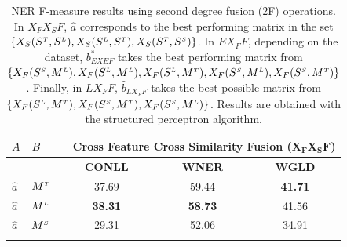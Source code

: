 \begin{table}[t!]
\centering

\caption{NER F-measure results using second degree fusion (2F) operations. In $X_FX_SF$, $\hat{a}$ corresponds to the best performing matrix in the set $\{ X_S(S^{\scriptscriptstyle T}, S^{\scriptscriptstyle L}),X_S(S^{\scriptscriptstyle L}, S^{\scriptscriptstyle T}), \allowbreak X_S(S^{\scriptscriptstyle T}, S^{\scriptscriptstyle S})\}$. In $EX_FF$, depending on the dataset, $b^*_{\scriptscriptstyle EXEF}$  takes the best performing matrix from $\{X_F(S^{\scriptscriptstyle S}, M^{\scriptscriptstyle L}), \allowbreak X_F(S^{\scriptscriptstyle L}, M^{\scriptscriptstyle L}), X_F(S^{\scriptscriptstyle L}, M^{\scriptscriptstyle T}), \allowbreak X_F(S^{\scriptscriptstyle S}, M^{\scriptscriptstyle L}), X_F(S^{\scriptscriptstyle S}, M^{\scriptscriptstyle T}) \}$. Finally, in $LX_FF$, $\hat{b}_{\scriptscriptstyle LX_FF}$ takes the best possible matrix from $\{X_F(S^{\scriptscriptstyle L}, M^{\scriptscriptstyle T}), X_F(S^{\scriptscriptstyle S}, M^{\scriptscriptstyle T}), \allowbreak X_F(S^{\scriptscriptstyle S}, M^{\scriptscriptstyle L}) \}$. Results are obtained with the structured perceptron algorithm.}
\label{tab:ner_2d}
\begin{tabular}{@{}llccc@{}}
	\toprule
	$A$                      & $B$            & \multicolumn{3}{r}{\textbf{Cross Feature Cross Similarity Fusion ($\mathbf{X_FX_SF}$)}}  \\ \midrule
	                         &                & \textbf{CONLL} & \textbf{WNER}  &             \textbf{WGLD}             \\
	\cmidrule{3-5}
$\hat{a}$ & $M^{\scriptscriptstyle T}$      & 37.69 & 59.44 &            \textbf{41.71}             \\
	$\hat{a}$                & $M^{\scriptscriptstyle L}$      & \textbf{38.31} & \textbf{58.73} &            41.56             \\
	$\hat{a}$                & $M^{\scriptscriptstyle S}$      & 29.31 & 52.06 &            34.91             \\ \midrule
	                         &                &
	                         

\end{tabular}
\end{table}
